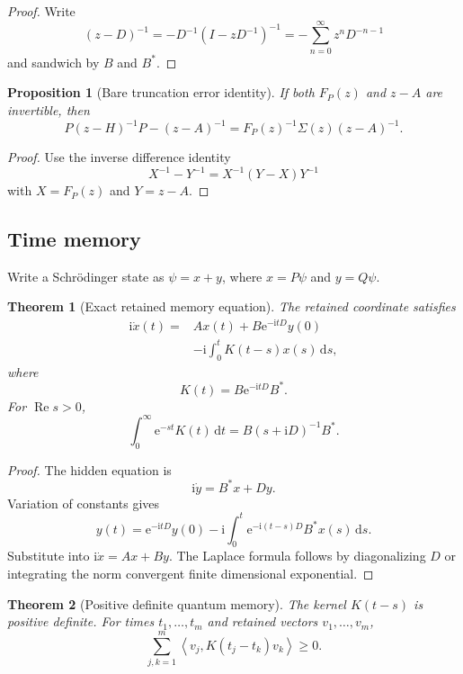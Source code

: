 \documentclass{aomart}
\newtheorem{theorem}{Theorem}[section]
\newtheorem{proposition}[proposition]{Proposition}
\theoremstyle{definition}
\theoremstyle{remark}
\newcommand{\e}{\mathrm e}
\newcommand{\ii}{\mathrm i}
\newcommand{\dd}{\,\mathrm d}
\newcommand{\ip}[2]{\left\langle#1,#2\right\rangle}
\begin{document}
\begin{proof}
Write
\[
(z-D)^{-1}
=-D^{-1}(I-zD^{-1})^{-1}
=-\sum_{n=0}^{\infty}z^nD^{-n-1}
\]
and sandwich by \(B\) and \(B^*\).
\end{proof}

\begin{proposition}[Bare truncation error identity]\label{prop:bare_truncation}
If both \(F_P(z)\) and \(z-A\) are invertible, then
\[
P(z-H)^{-1}P-(z-A)^{-1}
=
F_P(z)^{-1}\Sigma(z)(z-A)^{-1}.
\]
\end{proposition}

\begin{proof}
Use the inverse difference identity
\[
X^{-1}-Y^{-1}=X^{-1}(Y-X)Y^{-1}
\]
with \(X=F_P(z)\) and \(Y=z-A\).
\end{proof}

\subsection{Time memory}\label{subsec:time_memory}

Write a Schrödinger state as \(\psi=x+y\), where \(x=P\psi\) and \(y=Q\psi\).

\begin{theorem}[Exact retained memory equation]\label{thm:memory_equation}
The retained coordinate satisfies
\[
\begin{aligned}
\ii\dot x(t)
={}&Ax(t)+B\e^{-\ii tD}y(0)\\
&-\ii\int_0^tK(t-s)x(s)\dd s,
\end{aligned}
\]
where
\[
K(t)=B\e^{-\ii tD}B^*.
\]
For \(\operatorname{Re}s>0\),
\[
\int_0^\infty\e^{-st}K(t)\dd t
=
B(s+\ii D)^{-1}B^*.
\]
\end{theorem}

\begin{proof}
The hidden equation is
\[
\ii\dot y=B^*x+Dy.
\]
Variation of constants gives
\[
y(t)=\e^{-\ii tD}y(0)
-\ii\int_0^t\e^{-\ii(t-s)D}B^*x(s)\dd s.
\]
Substitute into \(\ii\dot x=Ax+By\). The Laplace formula follows by diagonalizing \(D\) or integrating the norm convergent finite dimensional exponential.
\end{proof}

\begin{theorem}[Positive definite quantum memory]\label{thm:positive_memory}
The kernel \(K(t-s)\) is positive definite. For times \(t_1,\ldots,t_m\) and retained vectors \(v_1,\ldots,v_m\),
\[
\sum_{j,k=1}^{m}
\ip{v_j}{K(t_j-t_k)v_k}
\geq0.
\]
\end{theorem}
\end{document}
